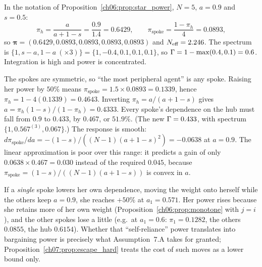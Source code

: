 \documentclass[../solutions_manual.tex]{subfiles}
\begin{document}

 In the notation of Proposition~\ref{ch06:prop:star_power}, $N = 5$, $a = 0.9$ and $s = 0.5$:
\[
\pi_h = \frac{a}{a + 1 - s} = \frac{0.9}{1.4} = 0.6429, \qquad \pi_{\text{spoke}} = \frac{1 - \pi_h}{4} = 0.0893,
\]
so $\boldsymbol{\pi} = (0.6429, 0.0893, 0.0893, 0.0893, 0.0893)$ and $N_{\text{eff}} = 2.246$. The spectrum is $\{1, s - a, 1 - a\ (\times 3)\} = \{1, -0.4, 0.1, 0.1, 0.1\}$, so $\Gamma = 1 - \max(0.4, 0.1) = 0.6$. Integration is high and power is concentrated.

 The spokes are symmetric, so ``the most peripheral agent'' is any spoke. Raising her power by $50\%$ means $\pi_{\text{spoke}} = 1.5 \times 0.0893 = 0.1339$, hence $\pi_h = 1 - 4(0.1339) = 0.4643$. Inverting $\pi_h = a/(a + 1 - s)$ gives $a = \pi_h(1-s)/(1 - \pi_h) = 0.4333$. Every spoke's dependence on the hub must fall from $0.9$ to $0.433$, by $0.467$, or $51.9\%$. (The new $\Gamma = 0.433$, with spectrum $\{1, 0.567^{(3)}, 0.067\}$.) The response is smooth: $d\pi_{\text{spoke}}/da = -(1-s)/((N-1)(a+1-s)^2) = -0.0638$ at $a = 0.9$. The linear approximation is poor over this range: it predicts a gain of only $0.0638 \times 0.467 = 0.030$ instead of the required $0.045$, because $\pi_{\text{spoke}} = (1-s)/((N-1)(a + 1 - s))$ is convex in $a$.

If a \emph{single} spoke lowers her own dependence, moving the weight onto herself while the others keep $a = 0.9$, she reaches $+50\%$ at $a_1 = 0.571$. Her power rises because she retains more of her own weight (Proposition~\ref{ch06:prop:monotone} with $j = i$), and the other spokes lose a little (e.g.\ at $a_1 = 0.6$: $\pi_1 = 0.1282$, the others $0.0855$, the hub $0.6154$). Whether that ``self-reliance'' power translates into bargaining power is precisely what Assumption~7.A takes for granted; Proposition~\ref{ch07:prop:escape_hard} treats the cost of such moves as a lower bound only.
\end{document}
